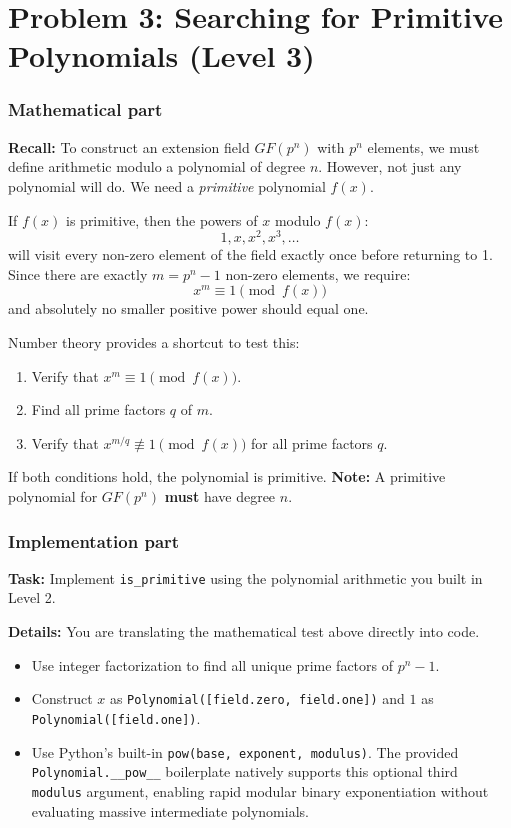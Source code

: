 \section*{Problem 3: Searching for Primitive Polynomials (Level 3)}

\subsubsection*{Mathematical part}
\textbf{Recall:} To construct an extension field $GF(p^n)$ with $p^n$ elements, we must define arithmetic modulo a polynomial of degree $n$. However, not just any polynomial will do. We need a \emph{primitive} polynomial $f(x)$.

If $f(x)$ is primitive, then the powers of $x$ modulo $f(x)$:
\[
1, x, x^2, x^3, \ldots
\]
will visit every non-zero element of the field exactly once before returning to 1. Since there are exactly $m = p^n - 1$ non-zero elements, we require:
\[
x^m \equiv 1 \pmod{f(x)}
\]
and absolutely no smaller positive power should equal one. 

Number theory provides a shortcut to test this:
\begin{enumerate}
    \item Verify that $x^m \equiv 1 \pmod{f(x)}$.
    \item Find all prime factors $q$ of $m$.
    \item Verify that $x^{m/q} \not\equiv 1 \pmod{f(x)}$ for all prime factors $q$.
\end{enumerate}
If both conditions hold, the polynomial is primitive.
\textbf{Note:} A primitive polynomial for $GF(p^n)$ \textbf{must} have degree $n$.


\subsubsection*{Implementation part}
\textbf{Task:} Implement \lstinline|is_primitive| using the polynomial arithmetic you built in Level 2.

\textbf{Details:} You are translating the mathematical test above directly into code. 
\begin{itemize}
    \item Use integer factorization to find all unique prime factors of $p^n - 1$.
    \item Construct $x$ as \lstinline|Polynomial([field.zero, field.one])| and $1$ as \lstinline|Polynomial([field.one])|.
    \item Use Python's built-in \lstinline|pow(base, exponent, modulus)|. The provided \lstinline|Polynomial.__pow__| boilerplate natively supports this optional third \lstinline|modulus| argument, enabling rapid modular binary exponentiation without evaluating massive intermediate polynomials.
\end{itemize}

